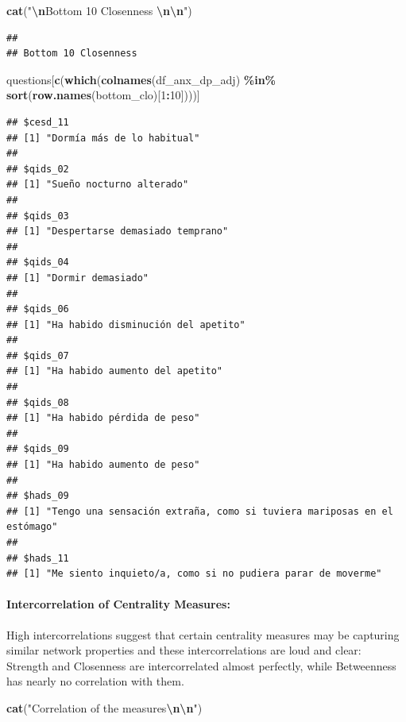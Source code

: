 \documentclass[
]{article}
\newenvironment{Shaded}{\begin{snugshade}}{\end{snugshade}}
\newcommand{\DecValTok}[1]{\textcolor[rgb]{0.00,0.00,0.81}{#1}}
\newcommand{\FunctionTok}[1]{\textcolor[rgb]{0.13,0.29,0.53}{\textbf{#1}}}
\newcommand{\NormalTok}[1]{#1}
\newcommand{\SpecialCharTok}[1]{\textcolor[rgb]{0.81,0.36,0.00}{\textbf{#1}}}
\newcommand{\StringTok}[1]{\textcolor[rgb]{0.31,0.60,0.02}{#1}}
\begin{document}
\begin{Shaded}
\begin{Highlighting}[]
\FunctionTok{cat}\NormalTok{(}\StringTok{"}\SpecialCharTok{\textbackslash{}n}\StringTok{Bottom 10 Closenness }\SpecialCharTok{\textbackslash{}n\textbackslash{}n}\StringTok{"}\NormalTok{)}
\end{Highlighting}
\end{Shaded}

\begin{verbatim}
## 
## Bottom 10 Closenness
\end{verbatim}

\begin{Shaded}
\begin{Highlighting}[]
\NormalTok{questions[}\FunctionTok{c}\NormalTok{(}\FunctionTok{which}\NormalTok{(}\FunctionTok{colnames}\NormalTok{(df\_anx\_dp\_adj) }\SpecialCharTok{\%in\%} \FunctionTok{sort}\NormalTok{(}\FunctionTok{row.names}\NormalTok{(bottom\_clo)[}\DecValTok{1}\SpecialCharTok{:}\DecValTok{10}\NormalTok{])))] }
\end{Highlighting}
\end{Shaded}

\begin{verbatim}
## $cesd_11
## [1] "Dormía más de lo habitual"
## 
## $qids_02
## [1] "Sueño nocturno alterado"
## 
## $qids_03
## [1] "Despertarse demasiado temprano"
## 
## $qids_04
## [1] "Dormir demasiado"
## 
## $qids_06
## [1] "Ha habido disminución del apetito"
## 
## $qids_07
## [1] "Ha habido aumento del apetito"
## 
## $qids_08
## [1] "Ha habido pérdida de peso"
## 
## $qids_09
## [1] "Ha habido aumento de peso"
## 
## $hads_09
## [1] "Tengo una sensación extraña, como si tuviera mariposas en el estómago"
## 
## $hads_11
## [1] "Me siento inquieto/a, como si no pudiera parar de moverme"
\end{verbatim}

\paragraph{Intercorrelation of Centrality
Measures:}\label{intercorrelation-of-centrality-measures}

High intercorrelations suggest that certain centrality measures may be
capturing similar network properties and these intercorrelations are
loud and clear: Strength and Closenness are intercorrelated almost
perfectly, while Betweenness has nearly no correlation with them.

\begin{Shaded}
\begin{Highlighting}[]
\FunctionTok{cat}\NormalTok{(}\StringTok{"Correlation of the measures}\SpecialCharTok{\textbackslash{}n\textbackslash{}n}\StringTok{"}\NormalTok{)}
\end{Highlighting}
\end{Shaded}
\end{document}
